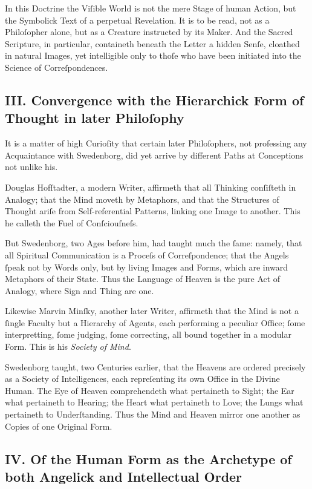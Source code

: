 \documentclass[12pt]{article}
\begin{document}
In this Doctrine the Viſible World is not the mere Stage of human Action, but 
the Symbolick Text of a perpetual Revelation. It is to be read, not as a 
Philoſopher alone, but as a Creature instructed by its Maker. And the Sacred 
Scripture, in particular, containeth beneath the Letter a hidden Senſe, 
cloathed in natural Images, yet intelligible only to thoſe who have been 
initiated into the Science of Correſpondences.

\subsection*{III. Convergence with the Hierarchick Form of Thought in later Philoſophy}

It is a matter of high Curioſity that certain later Philoſophers, not 
professing any Acquaintance with Swedenborg, did yet arrive by different 
Paths at Conceptions not unlike his.

Douglas Hofſtadter, a modern Writer, affirmeth that all Thinking conſiſteth 
in Analogy; that the Mind moveth by Metaphors, and that the Structures of 
Thought ariſe from Self-referential Patterns, linking one Image to another. 
This he calleth the Fuel of Conſciouſneſs.

But Swedenborg, two Ages before him, had taught much the ſame: namely, that 
all Spiritual Communication is a Proceſs of Correſpondence; that the Angels 
ſpeak not by Words only, but by living Images and Forms, which are inward 
Metaphors of their State. Thus the Language of Heaven is the pure Act of 
Analogy, where Sign and Thing are one.

Likewise Marvin Minſky, another later Writer, affirmeth that the Mind is not 
a ſingle Faculty but a Hierarchy of Agents, each performing a peculiar 
Office; ſome interpretting, ſome judging, ſome correcting, all bound together 
in a modular Form. This is his \textit{Society of Mind}.

Swedenborg taught, two Centuries earlier, that the Heavens are ordered 
precisely as a Society of Intelligences, each repreſenting its own Office in 
the Divine Human. The Eye of Heaven comprehendeth what pertaineth to Sight; 
the Ear what pertaineth to Hearing; the Heart what pertaineth to Love; the 
Lungs what pertaineth to Underſtanding. Thus the Mind and Heaven mirror one 
another as Copies of one Original Form.

\subsection*{IV. Of the Human Form as the Archetype of both Angelick and Intellectual Order}
\end{document}
